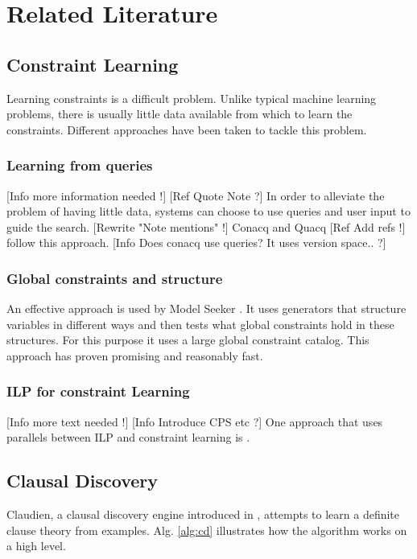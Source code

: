 \chapter{Related Literature}
\label{cha:rellit}

\section{Constraint Learning}
Learning constraints is a difficult problem. Unlike typical machine learning problems, there is usually little data available from which to learn the constraints. Different approaches have been taken to tackle this problem.

\subsection{Learning from queries}
[Info more information needed !] [Ref Quote Note ?]
In order to alleviate the problem of having little data, systems can choose to use queries and user input to guide the search. [Rewrite "Note mentions" !] Conacq and Quacq [Ref Add refs !] follow this approach. [Info Does conacq use queries? It uses version space.. ?]

\subsection{Global constraints and structure}
An effective approach is used by Model Seeker \cite{Beldiceanu:ModelSeeker}. It uses generators that structure variables in different ways and then tests what global constraints hold in these structures. For this purpose it uses a large global constraint catalog. This approach has proven promising and reasonably fast.

\subsection{ILP for constraint Learning}
[Info more text needed !] [Info Introduce CPS etc ?]
One approach that uses parallels between ILP and constraint learning is \cite{Lallouet:LearningCP}.

\section{Clausal Discovery}
Claudien, a clausal discovery engine introduced in \cite{DeRaedt:ClausalDiscovery}, attempts to learn a definite clause theory from examples. Alg. \ref{alg:cd} illustrates how the algorithm works on a high level. 


